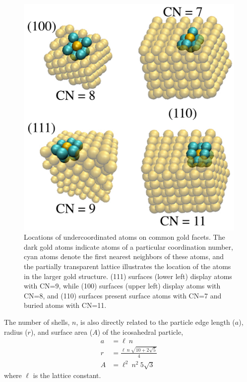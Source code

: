\begin{figure}[!htb]
        \includegraphics[width=5in]{figures/facets-cn.pdf}
        \caption{Locations of undercoordinated atoms on common gold
          facets. The dark gold atoms indicate atoms of a particular
          coordination number, cyan atoms denote the first nearest
          neighbors of these atoms, and the partially transparent
          lattice illustrates the location of the atoms in the larger
          gold structure. (111) surfaces (lower left) display atoms
          with CN=9, while (100) surfaces (upper left) display atoms
          with CN=8, and (110) surfaces present surface atoms with
          CN=7 and buried atoms with CN=11. }
        \label{fig:facets-cn}
\end{figure}
The number of shells, $n$, is also directly related to the particle
edge length ($a$), radius ($r$), and surface area ($A$) of the
icosahedral particle,
\begin{align}
a & = \ell~n \\
r & = \frac{\ell~n~\sqrt{10+2\sqrt{5}}}{4} \\
A & =  \ell^2~n^2~ 5 \sqrt{3}
\end{align}
where $\ell$ is the lattice constant.


